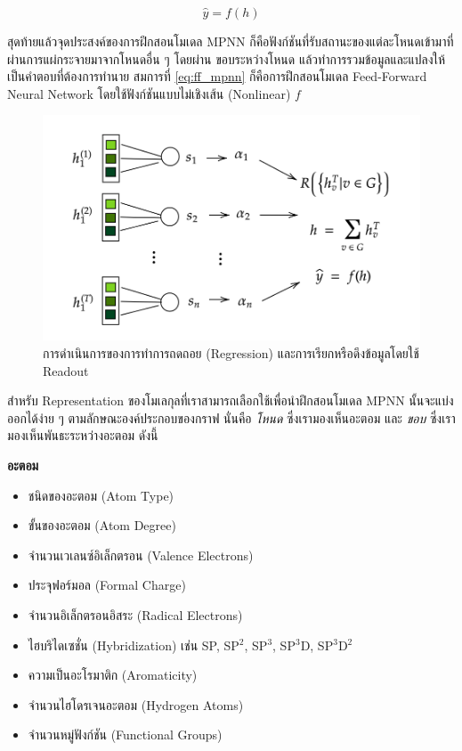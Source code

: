 \begin{equation}\label{eq:ff_mpnn}
    \hat{y} = f(h)
\end{equation}

สุดท้ายแล้วจุดประสงค์ของการฝึกสอนโมเดล MPNN ก็คือฟังก์ชันที่รับสถานะของแต่ละโหนดเข้ามาที่ผ่านการแผ่กระจายมาจากโหนดอื่น ๆ โดยผ่าน%
ขอบระหว่างโหนด แล้วทำการรวมข้อมูลและแปลงให้เป็นคำตอบที่ต้องการทำนาย สมการที่ \ref{eq:ff_mpnn} ก็คือการฝึกสอนโมเดล 
Feed-Forward Neural Network โดยใช้ฟังก์ชันแบบไม่เชิงเส้น (Nonlinear) $f$

\begin{figure}[htbp]
    \centering
    \includegraphics[width=0.9\linewidth]{fig/mp-operation.png}
    \caption{การดำเนินการของการทำการถดถอย (Regression) และการเรียกหรือดึงข้อมูลโดยใช้ Readout}
    \label{fig:mp_operation}
\end{figure}

สำหรับ Representation ของโมเลกุลที่เราสามารถเลือกใช้เพื่อนำฝึกสอนโมเดล MPNN นั้นจะแบ่งออกได้ง่าย ๆ ตามลักษณะองค์ประกอบของกราฟ 
นั่นคือ \textit{โหนด} ซึ่งเรามองเห็นอะตอม และ \textit{ขอบ} ซึ่งเรามองเห็นพันธะระหว่างอะตอม ดังนี้

\noindent \textbf{อะตอม}

\begin{itemize}[topsep=0pt]
    \item ชนิดของอะตอม (Atom Type)
    
    \item ขั้นของอะตอม (Atom Degree)
    
    \item จำนวนเวเลนซ์อิเล็กตรอน (Valence Electrons)
    
    \item ประจุฟอร์มอล (Formal Charge)
    
    \item จำนวนอิเล็กตรอนอิสระ (Radical Electrons)
    
    \item ไฮบริไดเซชั่น (Hybridization) เช่น SP, SP$^2$, SP$^3$, SP$^3$D, SP$^3$D$^2$
    
    \item ความเป็นอะโรมาติก (Aromaticity)
    
    \item จำนวนไฮโดรเจนอะตอม (Hydrogen Atoms)
    
    \item จำนวนหมู่ฟังก์ชัน (Functional Groups)
\end{itemize}

